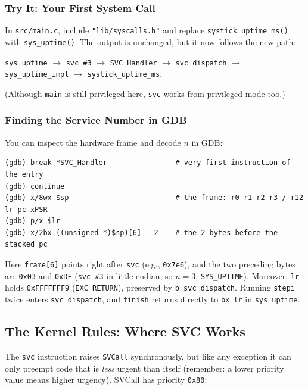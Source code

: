 \subsubsection{Try It: Your First System Call}
In \texttt{src/main.c}, include \texttt{"lib/syscalls.h"} and replace \texttt{systick\_uptime\_ms()} with \texttt{sys\_uptime()}. The output is unchanged, but it now follows the new path:

\texttt{sys\_uptime} $\rightarrow$ \texttt{svc \#3} $\rightarrow$ \texttt{SVC\_Handler} $\rightarrow$ \texttt{svc\_dispatch} $\rightarrow$ \texttt{sys\_uptime\_impl} $\rightarrow$ \texttt{systick\_uptime\_ms}.

(Although \texttt{main} is still privileged here, \texttt{svc} works from privileged mode too.)

\subsubsection{Finding the Service Number in GDB}
You can inspect the hardware frame and decode $n$ in GDB:
\begin{lstlisting}
(gdb) break *SVC_Handler                # very first instruction of the entry
(gdb) continue
(gdb) x/8wx $sp                         # the frame: r0 r1 r2 r3 / r12 lr pc xPSR
(gdb) p/x $lr
(gdb) x/2bx ((unsigned *)$sp)[6] - 2    # the 2 bytes before the stacked pc
\end{lstlisting}
Here \texttt{frame[6]} points right after \texttt{svc} (e.g., \texttt{0x7e6}), and the two preceding bytes are \texttt{0x03} and \texttt{0xDF} (\texttt{svc \#3} in little-endian, so $n = 3$, \texttt{SYS\_UPTIME}). Moreover, \texttt{lr} holds \texttt{0xFFFFFFF9} (\texttt{EXC\_RETURN}), preserved by \texttt{b svc\_dispatch}. Running \texttt{stepi} twice enters \texttt{svc\_dispatch}, and \texttt{finish} returns directly to \texttt{bx lr} in \texttt{sys\_uptime}.

\subsection{The Kernel Rules: Where SVC Works}
The \texttt{svc} instruction raises \texttt{SVCall} synchronously, but like any exception it can only preempt code that is \textit{less} urgent than itself (remember: a lower priority value means higher urgency). SVCall has priority \texttt{0x80}:

